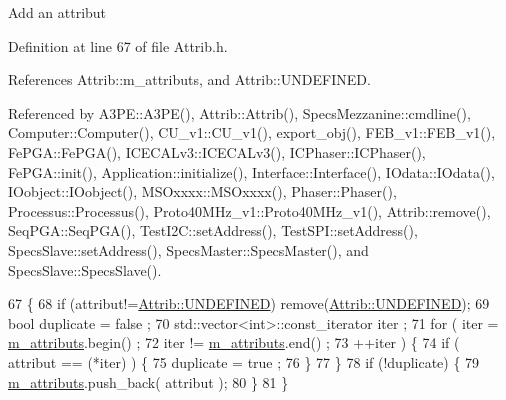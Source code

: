 Add an attribut 

Definition at line 67 of file Attrib.\+h.



References Attrib\+::m\+\_\+attributs, and Attrib\+::\+U\+N\+D\+E\+F\+I\+N\+ED.



Referenced by A3\+P\+E\+::\+A3\+P\+E(), Attrib\+::\+Attrib(), Specs\+Mezzanine\+::cmdline(), Computer\+::\+Computer(), C\+U\+\_\+v1\+::\+C\+U\+\_\+v1(), export\+\_\+obj(), F\+E\+B\+\_\+v1\+::\+F\+E\+B\+\_\+v1(), Fe\+P\+G\+A\+::\+Fe\+P\+G\+A(), I\+C\+E\+C\+A\+Lv3\+::\+I\+C\+E\+C\+A\+Lv3(), I\+C\+Phaser\+::\+I\+C\+Phaser(), Fe\+P\+G\+A\+::init(), Application\+::initialize(), Interface\+::\+Interface(), I\+Odata\+::\+I\+Odata(), I\+Oobject\+::\+I\+Oobject(), M\+S\+Oxxxx\+::\+M\+S\+Oxxxx(), Phaser\+::\+Phaser(), Processus\+::\+Processus(), Proto40\+M\+Hz\+\_\+v1\+::\+Proto40\+M\+Hz\+\_\+v1(), Attrib\+::remove(), Seq\+P\+G\+A\+::\+Seq\+P\+G\+A(), Test\+I2\+C\+::set\+Address(), Test\+S\+P\+I\+::set\+Address(), Specs\+Slave\+::set\+Address(), Specs\+Master\+::\+Specs\+Master(), and Specs\+Slave\+::\+Specs\+Slave().


\begin{DoxyCode}
67                             \{
68     \textcolor{keywordflow}{if} (attribut!=\hyperlink{classAttrib_a69e171d7cc6417835a5a306d3c764235a3a8da2ab97dda18aebab196fe4100531}{Attrib::UNDEFINED}) \textcolor{keyword}{remove}(\hyperlink{classAttrib_a69e171d7cc6417835a5a306d3c764235a3a8da2ab97dda18aebab196fe4100531}{Attrib::UNDEFINED});
69     \textcolor{keywordtype}{bool} duplicate = false ;
70     std::vector<int>::const\_iterator iter ;
71     \textcolor{keywordflow}{for} ( iter  = \hyperlink{classAttrib_ac4bd58a0cc6b38a3b711d609a3d3aacc}{m\_attributs}.begin() ;
72           iter != \hyperlink{classAttrib_ac4bd58a0cc6b38a3b711d609a3d3aacc}{m\_attributs}.end()   ;
73           ++iter ) \{
74       \textcolor{keywordflow}{if} ( attribut == (*iter) ) \{
75         duplicate = true ;
76       \}
77     \}
78     \textcolor{keywordflow}{if} (!duplicate) \{
79       \hyperlink{classAttrib_ac4bd58a0cc6b38a3b711d609a3d3aacc}{m\_attributs}.push\_back( attribut );
80     \}
81   \}
\end{DoxyCode}
\mbox{\label{classHierarchy_ad677774ff38fcb257c04a3a10d471fac}} 
